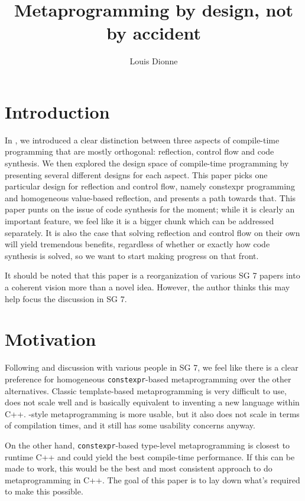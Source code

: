 \documentclass{wg21}
\title{Metaprogramming by design, not by accident}
\author{Louis Dionne}{ldionne.2@gmail.com}
\newcommand{\cc}[1]{\texttt{#1}}
\begin{document}
\maketitle

\section{Introduction}
In \cite{P0633}, we introduced a clear distinction between three aspects of
compile-time programming that are mostly orthogonal: reflection, control
flow and code synthesis. We then explored the design space of compile-time
programming by presenting several different designs for each aspect. This
paper picks one particular design for reflection and control flow, namely
constexpr programming and homogeneous value-based reflection, and presents
a path towards that. This paper punts on the issue of code synthesis for the
moment; while it is clearly an important feature, we feel like it is a bigger
chunk which can be addressed separately. It is also the case that solving
reflection and control flow on their own will yield tremendous benefits,
regardless of whether or exactly how code synthesis is solved, so we want
to start making progress on that front.

It should be noted that this paper is a reorganization of various SG 7 papers
into a coherent vision more than a novel idea. However, the author thinks this
may help focus the discussion in SG 7.


\section{Motivation}
Following \cite{P0633} and discussion with various people in SG 7, we feel like
there is a clear preference for homogeneous \cc{constexpr}-based metaprogramming
over the other alternatives. Classic template-based metaprogramming is very
difficult to use, does not scale well and is basically equivalent to inventing
a new language within C++. \cite{Boost.Hana}-style metaprogramming is more
usable, but it also does not scale in terms of compilation times, and it still
has some usability concerns anyway.

On the other hand, \cc{constexpr}-based type-level metaprogramming is closest
to runtime C++ and could yield the best compile-time performance. If this can
be made to work, this would be the best and most consistent approach to do
metaprogramming in C++. The goal of this paper is to lay down what's required
to make this possible.
\end{document}
